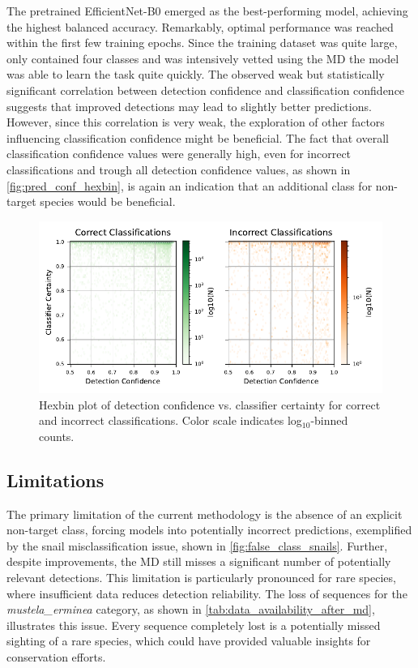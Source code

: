 The pretrained EfficientNet-B0 emerged as the best-performing model, achieving the highest balanced accuracy.
Remarkably, optimal performance was reached within the first few training epochs.
Since the training dataset was quite large, only contained four classes and was intensively vetted using the \ac{MD} the model was able to learn the task quite quickly.
The observed weak but statistically significant correlation between detection confidence and classification confidence suggests that improved detections may lead to slightly better predictions.
However, since this correlation is very weak, the exploration of other factors influencing classification confidence might be beneficial.
The fact that overall classification confidence values were generally high, even for incorrect classifications and trough all detection confidence values, as shown in \autoref{fig:pred_conf_hexbin}, is again an indication that an additional class for non-target species would be beneficial.

\begin{figure}[ht]
\centering
\includegraphics{figures/pred_conf_hexbin.pdf}
\caption{Hexbin plot of detection confidence vs. classifier certainty for correct and incorrect classifications. Color scale indicates log$_{10}$-binned counts.}
\label{fig:pred_conf_hexbin}
\end{figure}

\subsection{Limitations}

The primary limitation of the current methodology is the absence of an explicit non-target class, forcing models into potentially incorrect predictions, exemplified by the snail misclassification issue, shown in \autoref{fig:false_class_snails}.
Further, despite improvements, the \ac{MD} still misses a significant number of potentially relevant detections.
This limitation is particularly pronounced for rare species, where insufficient data reduces detection reliability.
The loss of sequences for the \textit{mustela\_erminea} category, as shown in \autoref{tab:data_availability_after_md}, illustrates this issue.
Every sequence completely lost is a potentially missed sighting of a rare species, which could have provided valuable insights for conservation efforts.

